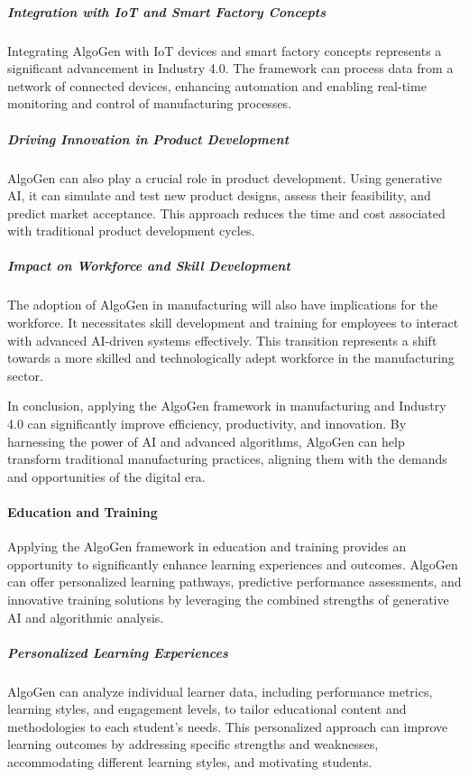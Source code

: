 \documentclass{article}
\begin{document}
\subparagraph{Integration with IoT and Smart Factory Concepts}
Integrating AlgoGen with IoT devices and smart factory concepts represents a significant advancement in Industry 4.0. The framework can process data from a network of connected devices, enhancing automation and enabling real-time monitoring and control of manufacturing processes.

\subparagraph{Driving Innovation in Product Development}
AlgoGen can also play a crucial role in product development. Using generative AI, it can simulate and test new product designs, assess their feasibility, and predict market acceptance. This approach reduces the time and cost associated with traditional product development cycles.

\subparagraph{Impact on Workforce and Skill Development}
The adoption of AlgoGen in manufacturing will also have implications for the workforce. It necessitates skill development and training for employees to interact with advanced AI-driven systems effectively. This transition represents a shift towards a more skilled and technologically adept workforce in the manufacturing sector.

In conclusion, applying the AlgoGen framework in manufacturing and Industry 4.0 can significantly improve efficiency, productivity, and innovation. By harnessing the power of AI and advanced algorithms, AlgoGen can help transform traditional manufacturing practices, aligning them with the demands and opportunities of the digital era.



\paragraph{Education and Training}
Applying the AlgoGen framework in education and training provides an opportunity to significantly enhance learning experiences and outcomes. AlgoGen can offer personalized learning pathways, predictive performance assessments, and innovative training solutions by leveraging the combined strengths of generative AI and algorithmic analysis.

\subparagraph{Personalized Learning Experiences}
AlgoGen can analyze individual learner data, including performance metrics, learning styles, and engagement levels, to tailor educational content and methodologies to each student’s needs. This personalized approach can improve learning outcomes by addressing specific strengths and weaknesses, accommodating different learning styles, and motivating students.
\end{document}
